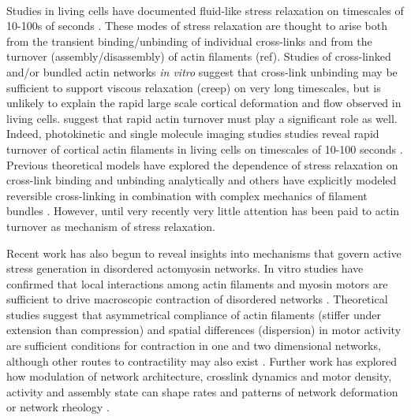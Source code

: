 \documentclass[10pt,letterpaper]{article}
\begin{document}
\paragraph{} Studies in living cells have documented fluid-like stress relaxation on timescales of 10-100s of seconds \cite{cellmech_flows,cellmech_flows2,cellmech_flows3,rheo_fluid,rheo_fluid2,cell_rheo_exp}.  These modes of stress relaxation are thought to arise both from the transient binding/unbinding of individual cross-links and from the turnover (assembly/disassembly) of actin filaments (ref).  Studies of cross-linked and/or bundled actin networks {\em in vitro} suggest that cross-link unbinding may be sufficient to support viscous relaxation (creep) on very long timescales\cite{rheo_crosslinksmatter,rheo_crosslinkslip1,rheo_crosslinkslip2,rheo_crosslinkslip3,rheo_nonaffine}, but is unlikely to explain the rapid large scale cortical deformation and flow observed in living cells.  suggest that rapid actin turnover must play a significant role as well. Indeed, photokinetic and single molecule imaging studies studies reveal rapid turnover of cortical actin filaments in living cells on timescales of 10-100 seconds \cite{Robin:2014aa}. Previous theoretical models have explored  the dependence of stress relaxation on cross-link binding and unbinding analytically \cite{theo_crosslinkslip1,theo_crosslinkslip2} and others have explicitly modeled reversible cross-linking in combination with complex mechanics of filament bundles \cite{model_taeyoon,rheo_crosslinkslip2,theo_crosslinkslip3}.  However, until very recently \cite{Mak:2016aa} very little attention has been paid to actin turnover as mechanism of stress relaxation. 

Recent work has also begun to reveal insights into mechanisms that govern active stress generation in disordered actomyosin networks. In vitro studies have confirmed that local interactions among actin filaments and myosin motors are sufficient to drive macroscopic contraction of disordered networks \cite{rheo_2D1}.  Theoretical studies suggest that asymmetrical compliance of actin filaments (stiffer under extension than compression) and spatial differences (dispersion) in motor activity are sufficient conditions for contraction in one \cite{1367-2630-14-3-033037} and two \cite{PhysRevX.4.041002} dimensional networks, although other routes to contractility may also exist \cite{PhysRevX.4.041002}.  Further work has explored how modulation of network architecture, crosslink dynamics and motor density, activity and assembly state can shape rates and patterns of network deformation \cite{10.1371/journal.pone.0039869,Alvarado:2013aa,C0SM00494D} or network rheology \cite{0295-5075-85-1-18007,rheo_active}.  
\end{document}
